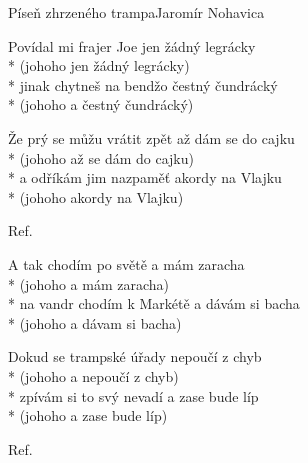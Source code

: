 \documentclass[10.5pt]{book}
\begin{document}
\begin{poem}{Píseň zhrzeného trampa}{Jaromír Nohavica}
\begin{altverse}
Povídal mi frajer Joe
jen žádný legrácky\\*
(johoho jen žádný legrácky)\\*
jinak chytneš na bendžo
čestný čundrácký\\*
(johoho a čestný čundrácký)
\end{altverse}

\begin{altverse}
Že prý se můžu vrátit zpět
až dám se do cajku\\*
(johoho až se dám do cajku)\\*
a odříkám jim nazpaměť
akordy na Vlajku\\*
(johoho akordy na Vlajku)
\end{altverse}

Ref.

\begin{altverse}
A tak chodím po světě
a mám zaracha\\*
(johoho a mám zaracha)\\*
na vandr chodím k Markétě
a dávám si bacha\\*
(johoho a dávam si bacha)
\end{altverse}

\begin{altverse}
Dokud se trampské úřady
nepoučí z chyb\\*
(johoho a nepoučí z chyb)\\*
zpívám si to svý nevadí
a zase bude líp\\*
(johoho a zase bude líp)
\end{altverse}

Ref.

\end{poem}
\end{document}
